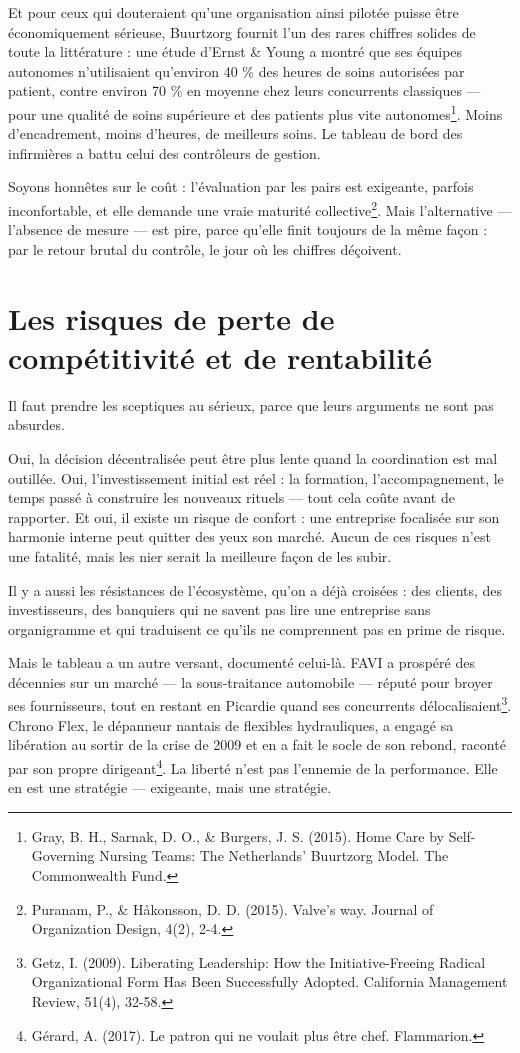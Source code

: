 Et pour ceux qui douteraient qu'une organisation ainsi pilotée puisse être économiquement sérieuse, Buurtzorg fournit l'un des rares chiffres solides de toute la littérature : une étude d'Ernst \& Young a montré que ses équipes autonomes n'utilisaient qu'environ 40 \% des heures de soins autorisées par patient, contre environ 70 \% en moyenne chez leurs concurrents classiques — pour une qualité de soins supérieure et des patients plus vite autonomes\footnote{Gray, B. H., Sarnak, D. O., \& Burgers, J. S. (2015). Home Care by Self-Governing Nursing Teams: The Netherlands' Buurtzorg Model. The Commonwealth Fund.}. Moins d'encadrement, moins d'heures, de meilleurs soins. Le tableau de bord des infirmières a battu celui des contrôleurs de gestion.

Soyons honnêtes sur le coût : l'évaluation par les pairs est exigeante, parfois inconfortable, et elle demande une vraie maturité collective\footnote{Puranam, P., \& Håkonsson, D. D. (2015). Valve's way. Journal of Organization Design, 4(2), 2-4.}. Mais l'alternative — l'absence de mesure — est pire, parce qu'elle finit toujours de la même façon : par le retour brutal du contrôle, le jour où les chiffres déçoivent.

\section{Les risques de perte de compétitivité et de rentabilité}

Il faut prendre les sceptiques au sérieux, parce que leurs arguments ne sont pas absurdes.

Oui, la décision décentralisée peut être plus lente quand la coordination est mal outillée. Oui, l'investissement initial est réel : la formation, l'accompagnement, le temps passé à construire les nouveaux rituels — tout cela coûte avant de rapporter. Et oui, il existe un risque de confort : une entreprise focalisée sur son harmonie interne peut quitter des yeux son marché. Aucun de ces risques n'est une fatalité, mais les nier serait la meilleure façon de les subir.

Il y a aussi les résistances de l'écosystème, qu'on a déjà croisées : des clients, des investisseurs, des banquiers qui ne savent pas lire une entreprise sans organigramme et qui traduisent ce qu'ils ne comprennent pas en prime de risque.

Mais le tableau a un autre versant, documenté celui-là. FAVI a prospéré des décennies sur un marché — la sous-traitance automobile — réputé pour broyer ses fournisseurs, tout en restant en Picardie quand ses concurrents délocalisaient\footnote{Getz, I. (2009). Liberating Leadership: How the Initiative-Freeing Radical Organizational Form Has Been Successfully Adopted. California Management Review, 51(4), 32-58.}. Chrono Flex, le dépanneur nantais de flexibles hydrauliques, a engagé sa libération au sortir de la crise de 2009 et en a fait le socle de son rebond, raconté par son propre dirigeant\footnote{Gérard, A. (2017). Le patron qui ne voulait plus être chef. Flammarion.}. La liberté n'est pas l'ennemie de la performance. Elle en est une stratégie — exigeante, mais une stratégie.

